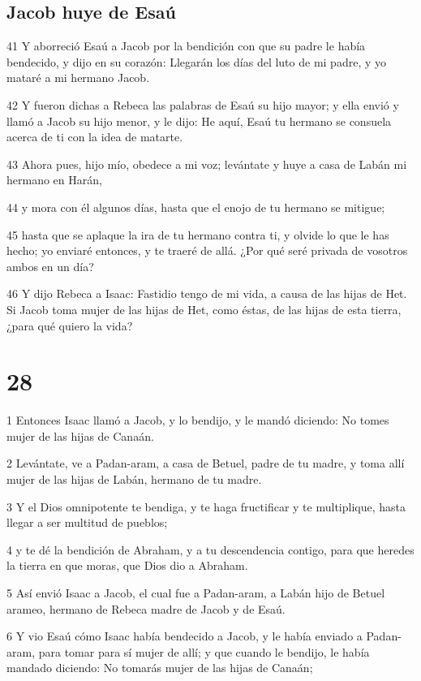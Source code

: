 \section{Jacob huye de Esaú}

41 Y aborreció Esaú a Jacob por la bendición con que su padre le había bendecido, y dijo en su corazón: Llegarán los días del luto de mi padre, y yo mataré a mi hermano Jacob.

42 Y fueron dichas a Rebeca las palabras de Esaú su hijo mayor; y ella envió y llamó a Jacob su hijo menor, y le dijo: He aquí, Esaú tu hermano se consuela acerca de ti con la idea de matarte.

43 Ahora pues, hijo mío, obedece a mi voz; levántate y huye a casa de Labán mi hermano en Harán,

44 y mora con él algunos días, hasta que el enojo de tu hermano se mitigue;

45 hasta que se aplaque la ira de tu hermano contra ti, y olvide lo que le has hecho; yo enviaré entonces, y te traeré de allá. ¿Por qué seré privada de vosotros ambos en un día?

46 Y dijo Rebeca a Isaac: Fastidio tengo de mi vida, a causa de las hijas de Het. Si Jacob toma mujer de las hijas de Het, como éstas, de las hijas de esta tierra, ¿para qué quiero la vida?

\chapter{28}

1 Entonces Isaac llamó a Jacob, y lo bendijo, y le mandó diciendo: No tomes mujer de las hijas de Canaán.

2 Levántate, ve a Padan-aram, a casa de Betuel, padre de tu madre, y toma allí mujer de las hijas de Labán, hermano de tu madre.

3 Y el Dios omnipotente te bendiga, y te haga fructificar y te multiplique, hasta llegar a ser multitud de pueblos;

4 y te dé la bendición de Abraham, y a tu descendencia contigo, para que heredes la tierra en que moras, que Dios dio a Abraham.

5 Así envió Isaac a Jacob, el cual fue a Padan-aram, a Labán hijo de Betuel arameo, hermano de Rebeca madre de Jacob y de Esaú.

6 Y vio Esaú cómo Isaac había bendecido a Jacob, y le había enviado a Padan-aram, para tomar para sí mujer de allí; y que cuando le bendijo, le había mandado diciendo: No tomarás mujer de las hijas de Canaán;

